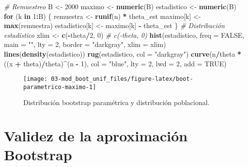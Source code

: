 \documentclass[
]{book}
\newenvironment{Shaded}{\begin{snugshade}}{\end{snugshade}}
\newcommand{\CommentTok}[1]{\textcolor[rgb]{0.56,0.35,0.01}{\textit{#1}}}
\newcommand{\ControlFlowTok}[1]{\textcolor[rgb]{0.13,0.29,0.53}{\textbf{#1}}}
\newcommand{\DataTypeTok}[1]{\textcolor[rgb]{0.13,0.29,0.53}{#1}}
\newcommand{\DecValTok}[1]{\textcolor[rgb]{0.00,0.00,0.81}{#1}}
\newcommand{\KeywordTok}[1]{\textcolor[rgb]{0.13,0.29,0.53}{\textbf{#1}}}
\newcommand{\NormalTok}[1]{#1}
\newcommand{\OperatorTok}[1]{\textcolor[rgb]{0.81,0.36,0.00}{\textbf{#1}}}
\newcommand{\OtherTok}[1]{\textcolor[rgb]{0.56,0.35,0.01}{#1}}
\newcommand{\StringTok}[1]{\textcolor[rgb]{0.31,0.60,0.02}{#1}}
\theoremstyle{break}
\theoremstyle{definition}
\theoremstyle{definition}
\theoremstyle{definition}
\theoremstyle{remark}
\begin{document}
\begin{Shaded}
\begin{Highlighting}[]
\CommentTok{# Remuestreo}
\NormalTok{B <-}\StringTok{ }\DecValTok{2000}
\NormalTok{maximo <-}\StringTok{ }\KeywordTok{numeric}\NormalTok{(B)}
\NormalTok{estadistico <-}\StringTok{ }\KeywordTok{numeric}\NormalTok{(B)}
\ControlFlowTok{for}\NormalTok{ (k }\ControlFlowTok{in} \DecValTok{1}\OperatorTok{:}\NormalTok{B) \{}
\NormalTok{    remuestra <-}\StringTok{ }\KeywordTok{runif}\NormalTok{(n) }\OperatorTok{*}\StringTok{ }\NormalTok{theta_est}
\NormalTok{    maximo[k] <-}\StringTok{ }\KeywordTok{max}\NormalTok{(remuestra)}
\NormalTok{    estadistico[k] <-}\StringTok{ }\NormalTok{maximo[k] }\OperatorTok{-}\StringTok{ }\NormalTok{theta_est}
\NormalTok{\}}
\CommentTok{# Distribución estadístico}
\NormalTok{xlim <-}\StringTok{ }\KeywordTok{c}\NormalTok{(}\OperatorTok{-}\NormalTok{theta}\OperatorTok{/}\DecValTok{2}\NormalTok{, }\DecValTok{0}\NormalTok{) }\CommentTok{# c(-theta, 0)}
\KeywordTok{hist}\NormalTok{(estadistico, }\DataTypeTok{freq =} \OtherTok{FALSE}\NormalTok{, }\DataTypeTok{main =} \StringTok{""}\NormalTok{, }\DataTypeTok{lty =} \DecValTok{2}\NormalTok{, }
     \DataTypeTok{border =} \StringTok{"darkgray"}\NormalTok{, }\DataTypeTok{xlim =}\NormalTok{ xlim)}
\KeywordTok{lines}\NormalTok{(}\KeywordTok{density}\NormalTok{(estadistico))}
\KeywordTok{rug}\NormalTok{(estadistico, }\DataTypeTok{col =} \StringTok{"darkgray"}\NormalTok{)}
\KeywordTok{curve}\NormalTok{(n}\OperatorTok{/}\NormalTok{theta }\OperatorTok{*}\StringTok{ }\NormalTok{((x }\OperatorTok{+}\StringTok{ }\NormalTok{theta)}\OperatorTok{/}\NormalTok{theta)}\OperatorTok{^}\NormalTok{(n }\OperatorTok{-}\StringTok{ }\DecValTok{1}\NormalTok{), }\DataTypeTok{col =} \StringTok{"blue"}\NormalTok{, }\DataTypeTok{lty =} \DecValTok{2}\NormalTok{, }\DataTypeTok{lwd =} \DecValTok{2}\NormalTok{, }\DataTypeTok{add =} \OtherTok{TRUE}\NormalTok{)}
\end{Highlighting}
\end{Shaded}

\begin{figure}[!htb]

{\centering \texttt{[image: 03-mod\_boot\_unif\_files/figure-latex/boot-parametrico-maximo-1]} 

}

\caption{Distribución bootstrap paramétrica y distribución poblacional.}\label{fig:boot-parametrico-maximo}
\end{figure}

\hypertarget{validez-de-la-aproximaciuxf3n-bootstrap}{%
\section{Validez de la aproximación Bootstrap}\label{validez-de-la-aproximaciuxf3n-bootstrap}}
\end{document}
